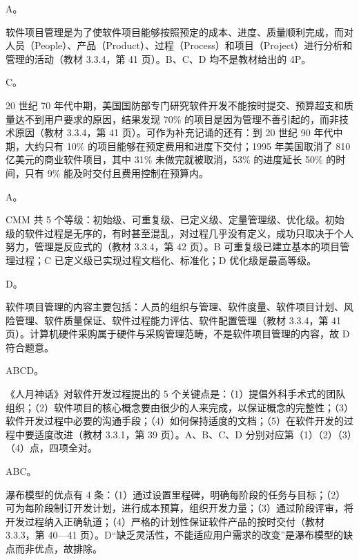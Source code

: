 \documentclass[a4paper,11pt]{article}
\begin{document}
\q A。\begin{analysis}软件项目管理是为了使软件项目能够按照预定的成本、进度、质量顺利完成，而对人员（People）、产品（Product）、过程（Process）和项目（Project）进行分析和管理的活动（教材 3.3.4，第 41 页）。B、C、D 均不是教材给出的 4P。\end{analysis}

\q C。\begin{analysis}20 世纪 70 年代中期，美国国防部专门研究软件开发不能按时提交、预算超支和质量达不到用户要求的原因，结果发现 70\% 的项目是因为管理不善引起的，而非技术原因（教材 3.3.4，第 41 页）。可作为补充记诵的还有：到 20 世纪 90 年代中期，大约只有 10\% 的项目能够在预定费用和进度下交付；1995 年美国取消了 810 亿美元的商业软件项目，其中 31\% 未做完就被取消，53\% 的进度延长 50\% 的时间，只有 9\% 能及时交付且费用控制在预算内。\end{analysis}

\q A。\begin{analysis}CMM 共 5 个等级：初始级、可重复级、已定义级、定量管理级、优化级。初始级的软件过程是无序的，有时甚至混乱，对过程几乎没有定义，成功只取决于个人努力，管理是反应式的（教材 3.3.4，第 42 页）。B 可重复级已建立基本的项目管理过程；C 已定义级已实现过程文档化、标准化；D 优化级是最高等级。\end{analysis}

\q D。\begin{analysis}软件项目管理的内容主要包括：人员的组织与管理、软件度量、软件项目计划、风险管理、软件质量保证、软件过程能力评估、软件配置管理（教材 3.3.4，第 41 页）。计算机硬件采购属于硬件与采购管理范畴，不是软件项目管理的内容，故 D 符合题意。\end{analysis}


\q ABCD。\begin{analysis}《人月神话》对软件开发过程提出的 5 个关键点是：（1）提倡外科手术式的团队组织；（2）软件项目的核心概念要由很少的人来完成，以保证概念的完整性；（3）软件开发过程中必要的沟通手段；（4）如何保持适度的文档；（5）在软件开发的过程中要适度改进（教材 3.3.1，第 39 页）。A、B、C、D 分别对应第（1）（2）（3）（4）点，四项全对。\end{analysis}

\q ABC。\begin{analysis}瀑布模型的优点有 4 条：（1）通过设置里程碑，明确每阶段的任务与目标；（2）可为每阶段制订开发计划，进行成本预算，组织开发力量；（3）通过阶段评审，将开发过程纳入正确轨道；（4）严格的计划性保证软件产品的按时交付（教材 3.3.3，第 40—41 页）。D“缺乏灵活性，不能适应用户需求的改变”是瀑布模型的缺点而非优点，故排除。\end{analysis}
\end{document}
